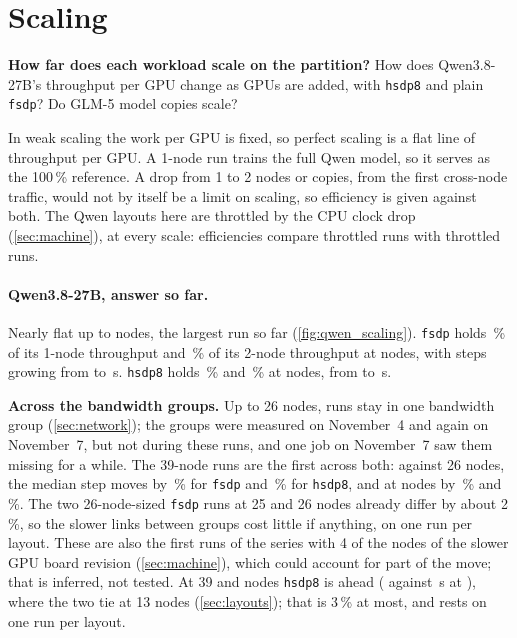 \section{Scaling}
\label{sec:scaling}

\begin{question}
  \textbf{How far does each workload scale on the partition?} How does Qwen3.8-27B's throughput per GPU change as GPUs are added, with \texttt{hsdp8} and plain \texttt{fsdp}? Do GLM-5 model copies scale?
\end{question}

In weak scaling the work per GPU is fixed, so perfect scaling is a flat line of throughput per GPU. A 1-node run trains the full Qwen model, so it serves as the 100\,\% reference. A drop from 1 to 2 nodes or copies, from the first cross-node traffic, would not by itself be a limit on scaling, so efficiency is given against both. The Qwen layouts here are throttled by the CPU clock drop (\cref{sec:machine}), at every scale: efficiencies compare throttled runs with throttled runs.

\paragraph{Qwen3.8-27B, answer so far.} Nearly flat up to \TriWeakTop{} nodes, the largest run so far (\cref{fig:qwen_scaling}). \texttt{fsdp} holds \TriWeakFEffOne\,\% of its 1-node throughput and \TriWeakFEffTwo\,\% of its 2-node throughput at \TriWeakFTop{} nodes, with steps growing from \TriWeakFStepOne{} to \TriWeakFStep\,s. \texttt{hsdp8} holds \TriWeakHEffOne\,\% and \TriWeakHEffTwo\,\% at \TriWeakHTop{} nodes, from \TriWeakHStepOne{} to \TriWeakHStep\,s.

\textbf{Across the bandwidth groups.} Up to 26 nodes, runs stay in one bandwidth group (\cref{sec:network}); the groups were measured on November~4 and again on November~7, but not during these runs, and one job on November~7 saw them missing for a while. The 39-node runs are the first across both: against 26 nodes, the median step moves by \TriWeakFCross\,\% for \texttt{fsdp} and \TriWeakHCross\,\% for \texttt{hsdp8}, and at \TriWeakTop{} nodes by \TriWeakFCrossTop\,\% and \TriWeakHCrossTop\,\%. The two 26-node-sized \texttt{fsdp} runs at 25 and 26 nodes already differ by about 2\,\%, so the slower links between groups cost little if anything, on one run per layout. These are also the first runs of the series with 4 of the \TriBoardNodes{} nodes of the slower GPU board revision (\cref{sec:machine}), which could account for part of the move; that is inferred, not tested. At 39 and \TriWeakTop{} nodes \texttt{hsdp8} is ahead (\TriWeakHStep{} against \TriWeakFStep\,s at \TriWeakTop), where the two tie at 13 nodes (\cref{sec:layouts}); that is 3\,\% at most, and rests on one run per layout.

